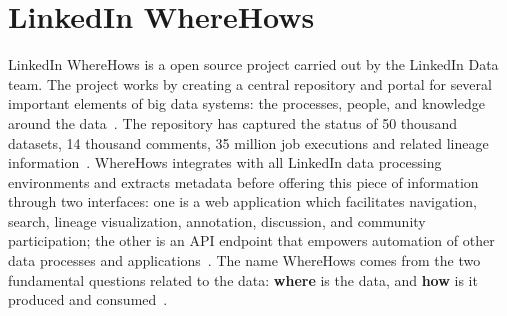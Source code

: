 \section{LinkedIn WhereHows}

LinkedIn WhereHows is a open source project carried out by the
LinkedIn Data team. The project works by creating a central repository
and portal for several important elements of big data systems: the
processes, people, and knowledge around the
data~\cite{hid-sp18-405-www-wherehows}. The repository has captured
the status of 50 thousand datasets, 14 thousand comments, 35 million
job executions and related lineage
information~\cite{hid-sp18-405-www-wherehows}. WhereHows integrates
with all LinkedIn data processing environments and extracts metadata
before offering this piece of information through two interfaces: one
is a web application which facilitates navigation, search, lineage
visualization, annotation, discussion, and community participation;
the other is an API endpoint that empowers automation of other data
processes and applications~\cite{hid-sp18-405-www-wherehows}. The name
WhereHows comes from the two fundamental questions related to the
data: \textbf{where} is the data, and \textbf{how} is it produced and
consumed~\cite{hid-sp18-405-githubwiki-wherehows}.
